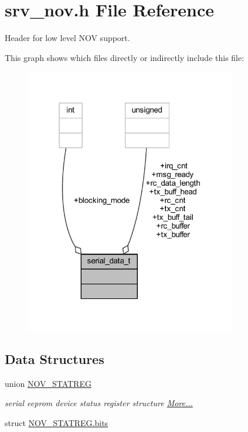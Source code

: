 \hypertarget{a00029}{\section{srv\+\_\+nov.\+h File Reference}
\label{a00029}
}


Header for low level N\+O\+V support.  


This graph shows which files directly or indirectly include this file\+:\nopagebreak
\begin{figure}[H]
\begin{center}
\leavevmode
\includegraphics[width=261pt]{d0/d31/a01686}
\end{center}
\end{figure}
\subsection*{Data Structures}
\begin{DoxyCompactItemize}
\item 
union \hyperlink{a00029_d0/d1c/a00605}{N\+O\+V\+\_\+\+S\+T\+A\+T\+R\+E\+G}
\begin{DoxyCompactList}\small\item\em serial eeprom device status register structure  \hyperlink{a00029_d0/d1c/a00605}{More...}\end{DoxyCompactList}\item 
struct \hyperlink{a00029_d8/d00/a00606}{N\+O\+V\+\_\+\+S\+T\+A\+T\+R\+E\+G.\+bits}
\end{DoxyCompactItemize}
